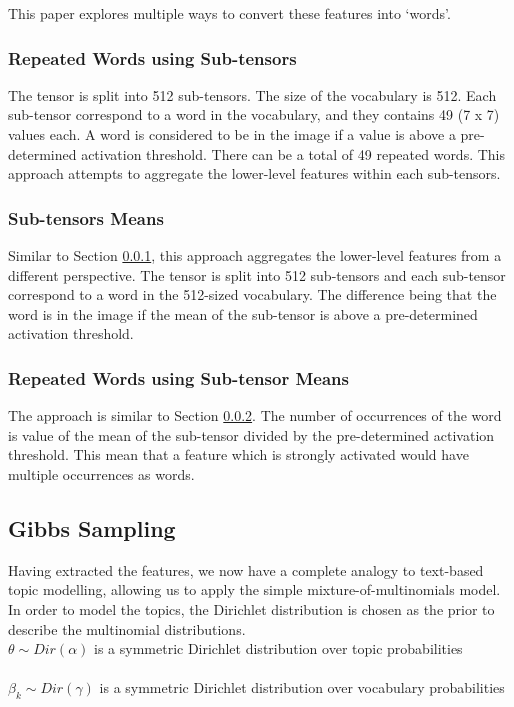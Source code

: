 \documentclass{article}
\newcommand\tab[1][1cm]{\hspace*{#1}}
\begin{document}
This paper explores multiple ways to convert these features into `words'.

\subsubsection{Repeated Words using Sub-tensors}\label{repeatedSubtensor}
The tensor is split into 512 sub-tensors. The size of the vocabulary is 512. Each sub-tensor correspond to a word in the vocabulary, and they contains 49 (7 x 7) values each. A word is considered to be in the image if a value is above a pre-determined activation threshold. There can be a total of 49 repeated words. This approach attempts to aggregate the lower-level features within each sub-tensors.

\subsubsection{Sub-tensors Means}\label{meanSubtensor}
Similar to Section \ref{repeatedSubtensor}, this approach aggregates the lower-level features from a different perspective. The tensor is split into 512 sub-tensors and each sub-tensor correspond to a word in the 512-sized vocabulary. The difference being that the word is in the image if the mean of the sub-tensor is above a pre-determined activation threshold.

\subsubsection{Repeated Words using Sub-tensor Means}\label{repeatedmeanSubtensor}
The approach is similar to Section \ref{meanSubtensor}. The number of occurrences of the word is value of the mean of the sub-tensor divided by the pre-determined activation threshold. This mean that a feature which is strongly activated would have multiple occurrences as words. 

\subsection{Gibbs Sampling}
Having extracted the features, we now have a complete analogy to text-based topic modelling, allowing us to apply the simple mixture-of-multinomials model. In order to model the topics, the Dirichlet distribution is chosen as the prior to describe the multinomial distributions. \\
\newline
\tab $\theta \sim Dir(\alpha)$ is a symmetric Dirichlet distribution over topic probabilities \\
\\
\tab $\beta_k \sim Dir(\gamma)$ is a symmetric Dirichlet distribution over vocabulary probabilities \\
\end{document}
